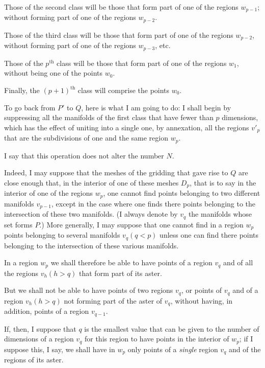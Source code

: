 \documentclass{article}
\begin{document}
Those of the second class will be those that form part of one of the regions $w_{p-1}$; without forming part of one of the regions $w_{p-2}$.

Those of the third class will be those that form part of one of the regions $w_{p-2}$, without forming part of one of the regions $w_{p-3}$, etc.

Those of the $p^{\text{th}}$ class will be those that form part of one of the regions $w_{1}$, without being one of the points $w_{0}$.

Finally, the $(p + 1)^{\text{th}}$ class will comprise the points $w_{0}$.

To go back from $P'$ to $Q$, here is what I am going to do: I shall begin by suppressing all the manifolds of the first class that have fewer than $p$ dimensions, which has the effect of uniting into a single one, by annexation, all the regions $v'_{p}$ that are the subdivisions of one and the same region $w_{p}$.

I say that this operation does not alter the number $N$.

Indeed, I may suppose that the meshes of the gridding that gave rise to $Q$ are close enough that, in the interior of one of these meshes $D_{p}$, that is to say in the interior of one of the regions $w_{p}$, one cannot find points belonging to two different manifolds $v_{p-1}$, except in the case where one finds there points belonging to the intersection of these two manifolds. (I always denote by $v_{q}$ the manifolds whose set forms $P$.) More generally, I may suppose that one cannot find in a region $w_{p}$ points belonging to several manifolds $v_{q} (q < p)$ unless one can find there points belonging to the intersection of these various manifolds.

In a region $w_{p}$ we shall therefore be able to have points of a region $v_{q}$ and of all the regions $v_{h} (h > q)$ that form part of its aster.

But we shall not be able to have points of two regions $v_{q}$, or points of $v_{q}$ and of a region $v_{h} (h > q)$ not forming part of the aster of $v_{q}$, without having, in addition, points of a region $v_{q-1}$.

If, then, I suppose that $q$ is the smallest value that can be given to the number of dimensions of a region $v_{q}$ for this region to have points in the interior of $w_{p}$; if I suppose this, I say, we shall have in $w_{p}$ only points of a \emph{single} region $v_{q}$ and of the regions of its aster.
\end{document}
